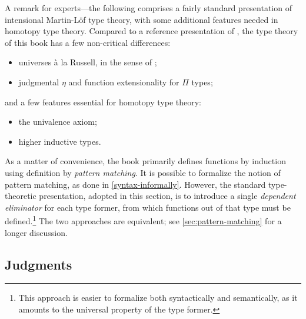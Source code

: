 \newcommand{\Gm}{\Gamma}      %
\newcommand{\ctx}{\ensuremath{\mathsf{ctx}}}
\newcommand{\emptyctx}{\cdot}
\newcommand{\wfctx}[1]{\vdash #1\ \ctx}
\newcommand{\oftp}[3]{#1 \vdash #2 : #3}
\newcommand{\jdeqtp}[4]{#1 \vdash #2 \jdeq #3 : #4}
\newcommand{\judg}[2]{#1 \vdash #2}
\newcommand{\tmtp}[2]{#1 \mathord{:} #2}
\newcommand{\form}{\textsc{form}}
\newcommand{\intro}{\textsc{intro}}
\newcommand{\elim}{\textsc{elim}}
\newcommand{\comp}{\textsc{comp}}
\newcommand{\Weak}{\mathsf{Wkg}}
\newcommand{\Vble}{\mathsf{Vble}}
\newcommand{\Exch}{\mathsf{Exch}}
\newcommand{\Subst}{\mathsf{Subst}}

\let\syn\mathsf

A remark for experts---the following comprises a fairly standard presentation of
intensional Martin-L\"{o}f type theory, with some additional features needed in
homotopy type theory. Compared to a reference presentation of
\cite{hofmann:syntax-and-semantics}, the type theory of this book has a few
non-critical differences:
\begin{itemize}
\item universes \`{a} la Russell, in the sense of
\cite{martin-lof:bibliopolis};
\item judgmental $\eta$ and function extensionality for $\Pi$ types;
\end{itemize}
and a few features essential for homotopy type theory:
\begin{itemize}
\item the univalence axiom;
\item higher inductive types.
\end{itemize}

As a matter of convenience, the book primarily defines functions by induction
using definition by \emph{pattern matching}. It is possible to formalize the
notion of pattern matching, as done in \autoref{syntax-informally}. However, the
standard type-theoretic presentation, adopted in this section, is to introduce a single \emph{dependent
eliminator} for each type former, from which functions out of that type must be
defined.\footnote{This approach is easier to formalize both syntactically and
semantically, as it amounts to the universal property of the type former.}
The two approaches are equivalent; see \autoref{sec:pattern-matching} for a
longer discussion.

\subsection{Judgments}

